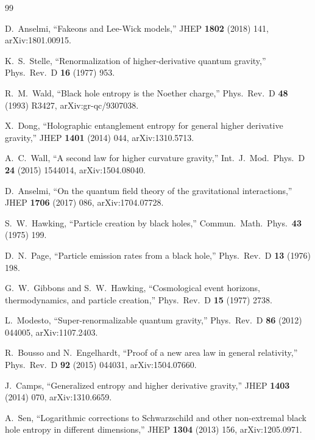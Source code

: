 \documentclass[11pt,a4paper]{article}
\theoremstyle{plain}
\theoremstyle{definition}
\begin{document}
\begin{thebibliography}{99}

  D.~Anselmi,
  ``Fakeons and Lee-Wick models,''
  JHEP \textbf{1802} (2018) 141,
  arXiv:1801.00915.

  K.~S.~Stelle,
  ``Renormalization of higher-derivative quantum gravity,''
  Phys.\ Rev.\ D \textbf{16} (1977) 953.

  R.~M.~Wald,
  ``Black hole entropy is the Noether charge,''
  Phys.\ Rev.\ D \textbf{48} (1993) R3427,
  arXiv:gr-qc/9307038.

  X.~Dong,
  ``Holographic entanglement entropy for general higher derivative
  gravity,''
  JHEP \textbf{1401} (2014) 044,
  arXiv:1310.5713.

  A.~C.~Wall,
  ``A second law for higher curvature gravity,''
  Int.\ J.\ Mod.\ Phys.\ D \textbf{24} (2015) 1544014,
  arXiv:1504.08040.

  D.~Anselmi,
  ``On the quantum field theory of the gravitational
  interactions,''
  JHEP \textbf{1706} (2017) 086,
  arXiv:1704.07728.

  S.~W.~Hawking,
  ``Particle creation by black holes,''
  Commun.\ Math.\ Phys.\ \textbf{43} (1975) 199.

  D.~N.~Page,
  ``Particle emission rates from a black hole,''
  Phys.\ Rev.\ D \textbf{13} (1976) 198.

  G.~W.~Gibbons and S.~W.~Hawking,
  ``Cosmological event horizons, thermodynamics, and particle
  creation,''
  Phys.\ Rev.\ D \textbf{15} (1977) 2738.

  L.~Modesto,
  ``Super-renormalizable quantum gravity,''
  Phys.\ Rev.\ D \textbf{86} (2012) 044005,
  arXiv:1107.2403.

  R.~Bousso and N.~Engelhardt,
  ``Proof of a new area law in general relativity,''
  Phys.\ Rev.\ D \textbf{92} (2015) 044031,
  arXiv:1504.07660.

  J.~Camps,
  ``Generalized entropy and higher derivative gravity,''
  JHEP \textbf{1403} (2014) 070,
  arXiv:1310.6659.

  A.~Sen,
  ``Logarithmic corrections to Schwarzschild and other
  non-extremal black hole entropy in different dimensions,''
  JHEP \textbf{1304} (2013) 156,
  arXiv:1205.0971.


\end{thebibliography}
\end{document}

